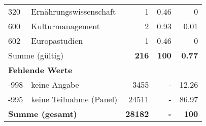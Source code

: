 \begin{longtable}{lXrrr}
        320 & \multicolumn{1}{X}{Ernährungswissenschaft} & %
          \num{1} &
          \num[round-mode=places,round-precision=2]{0.46} &
          \num[round-mode=places,round-precision=2]{0} \\

        600 & \multicolumn{1}{X}{Kulturmanagement} & %
          \num{2} &
          \num[round-mode=places,round-precision=2]{0.93} &
          \num[round-mode=places,round-precision=2]{0.01} \\

        602 & \multicolumn{1}{X}{Europastudien} & %
          \num{1} &
          \num[round-mode=places,round-precision=2]{0.46} &
          \num[round-mode=places,round-precision=2]{0} \\

     \midrule
     \multicolumn{2}{l}{Summe (gültig)} &
       \textbf{\num{216}} &
     \textbf{\num{100}} &
       \textbf{\num[round-mode=places,round-precision=2]{0.77}} \\
     \multicolumn{5}{l}{\textbf{Fehlende Werte}}\\
       -998 &
       keine Angabe &
         \num{3455} &
        - &
         \num[round-mode=places,round-precision=2]{12.26} \\
       -995 &
       keine Teilnahme (Panel) &
         \num{24511} &
        - &
         \num[round-mode=places,round-precision=2]{86.97} \\
     \midrule
     \multicolumn{2}{l}{\textbf{Summe (gesamt)}} &
          \textbf{\num{28182}} &
        \textbf{-} &
        \textbf{\num{100}} \\
     \bottomrule
     \end{longtable}
     
